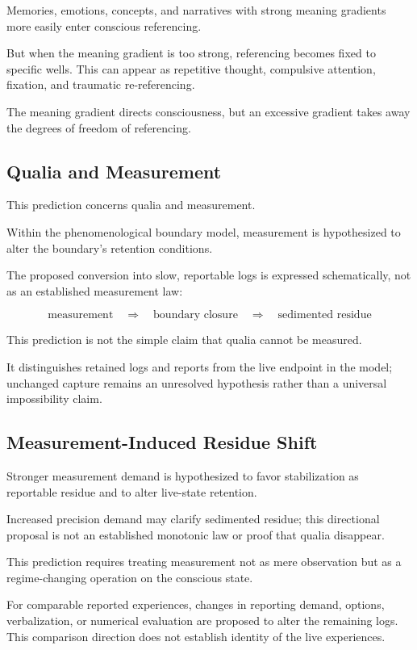 Memories, emotions, concepts, and narratives with strong meaning gradients more easily enter conscious referencing.

But when the meaning gradient is too strong, referencing becomes fixed to specific wells. This can appear as repetitive thought, compulsive attention, fixation, and traumatic re-referencing.

The meaning gradient directs consciousness, but an excessive gradient takes away the degrees of freedom of referencing.

\subsection{Qualia and Measurement}


This prediction concerns qualia and measurement.

Within the phenomenological boundary model, measurement is hypothesized to alter the boundary's retention conditions.

The proposed conversion into slow, reportable logs is expressed schematically, not as an established measurement law:

\begin{equation}
\text{measurement} \quad \Rightarrow \quad \text{boundary closure} \quad \Rightarrow \quad \text{sedimented residue}
\end{equation}

This prediction is not the simple claim that qualia cannot be measured.

It distinguishes retained logs and reports from the live endpoint in the model; unchanged capture remains an unresolved hypothesis rather than a universal impossibility claim.

\subsection{Measurement-Induced Residue Shift}


Stronger measurement demand is hypothesized to favor stabilization as reportable residue and to alter live-state retention.

Increased precision demand may clarify sedimented residue; this directional proposal is not an established monotonic law or proof that qualia disappear.

This prediction requires treating measurement not as mere observation but as a regime-changing operation on the conscious state.

For comparable reported experiences, changes in reporting demand, options, verbalization, or numerical evaluation are proposed to alter the remaining logs. This comparison direction does not establish identity of the live experiences.

